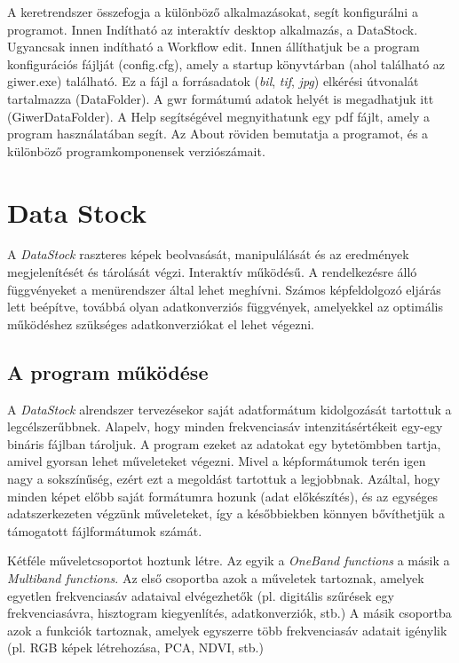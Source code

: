 \documentclass[a4paper,12pt]{article}
\begin{document}
A keretrendszer összefogja a különböző alkalmazásokat, segít konfigurálni a programot. Innen Indítható az interaktív desktop alkalmazás, a DataStock. Ugyancsak innen indítható a Workflow edit. Innen állíthatjuk be a program konfigurációs fájlját (config.cfg), amely a startup könyvtárban (ahol található az giwer.exe) található. Ez a fájl a forrásadatok (\textit{bil}, \textit{tif}, \textit{jpg}) elkérési útvonalát tartalmazza (DataFolder). A gwr formátumú adatok helyét is megadhatjuk itt (GiwerDataFolder). A Help segítségével megnyithatunk egy pdf fájlt, amely a program használatában segít. Az About röviden bemutatja a programot, és a különböző programkomponensek verziószámait.

\section{Data Stock}

A \textit{DataStock} raszteres képek beolvasását, manipulálását és az eredmények megjelenítését és tárolását végzi. Interaktív működésű. A rendelkezésre álló függvényeket a menürendszer által lehet meghívni. Számos képfeldolgozó eljárás lett beépítve, továbbá olyan adatkonverziós függvények, amelyekkel az optimális működéshez szükséges adatkonverziókat el lehet végezni.

\subsection{A program működése}

A \textit{DataStock} alrendszer tervezésekor saját adatformátum kidolgozását tartottuk a legcélszerűbbnek. Alapelv, hogy minden frekvenciasáv intenzitásértékeit egy-egy bináris fájlban tároljuk. A program ezeket az adatokat egy bytetömbben tartja, amivel gyorsan lehet műveleteket végezni. Mivel a képformátumok terén igen nagy a sokszínűség, ezért ezt a megoldást tartottuk a legjobbnak. Azáltal, hogy minden képet előbb saját formátumra hozunk (adat előkészítés), és az egységes adatszerkezeten végzünk műveleteket, így a későbbiekben könnyen bővíthetjük a támogatott fájlformátumok számát.

Kétféle műveletcsoportot hoztunk létre. Az egyik a \textit{OneBand functions} a másik a \textit{Multiband functions}. Az első csoportba azok a műveletek tartoznak, amelyek egyetlen frekvenciasáv adataival elvégezhetők (pl. digitális szűrések egy frekvenciasávra, hisztogram kiegyenlítés, adatkonverziók, stb.) A másik csoportba azok a funkciók tartoznak, amelyek egyszerre több frekvenciasáv adatait igénylik (pl. RGB képek létrehozása, PCA, NDVI, stb.)
\end{document}
